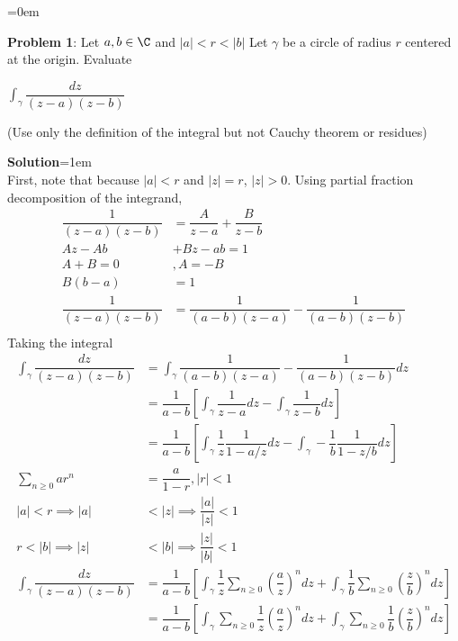 \documentclass{article}
\begin{document}

\newpage\parskip=0em
\begin{mdframed}[backgroundcolor=blue!20]
\textbf{Problem 1}: Let $a, b \in \C$ and $|a| < r < |b|$ Let $\gamma$ be a circle of radius $r$ centered at the origin. Evaluate
\begin{center}
    $\int_{\gamma} \dfrac{dz}{(z-a)(z-b)}$
\end{center}
(Use only the definition of the integral but not Cauchy theorem or residues)
\end{mdframed}
\textbf{Solution}\parskip=1em\\
First, note that because $|a| < r$ and $|z| = r$, $|z| > 0$. Using partial fraction decomposition of the integrand,
\begin{align*}
    \dfrac{1}{(z-a)(z-b)} &= \dfrac{A}{z-a} + \dfrac{B}{z-b}\\
    Az -Ab &+ Bz -ab = 1\\
    A + B = 0 &, A = -B\\
    B(b-a) &= 1\\
    \dfrac{1}{(z-a)(z-b)} &=  \dfrac{1}{(a-b)(z-a)} - \dfrac{1}{(a-b)(z-b)}\\
\end{align*}
Taking the integral 
\begin{align*}
    \int_{\gamma} \dfrac{dz}{(z-a)(z-b)} &= \int_\gamma \dfrac{1}{(a-b)(z-a)} - \dfrac{1}{(a-b)(z-b)}dz\\
    &= \dfrac{1}{a-b}\left[\int_\gamma \dfrac{1}{z-a}dz - \int_\gamma\dfrac{1}{z-b}dz\right]\\
    &= \dfrac{1}{a-b}\left[\int_\gamma \dfrac{1}{z}\dfrac{1}{1-a/z}dz   - \int_\gamma-\dfrac{1}{b}\dfrac{1}{1-z/b}dz\right]\\
    \sum\limits_{n \geq 0}ar^{n} &= \dfrac{a}{1-r}, |r| < 1\\
    |a| < r \implies |a| &< |z| \implies \dfrac{|a|}{|z|} < 1\\
    r < |b| \implies |z| &< |b| \implies \dfrac{|z|}{|b|} < 1\\
    \int_{\gamma} \dfrac{dz}{(z-a)(z-b)} &= \dfrac{1}{a-b}\left[\int_\gamma \dfrac{1}{z}\sum\limits_{n\geq 0}(\dfrac{a}{z})^ndz   + \int_\gamma\dfrac{1}{b}\sum\limits_{n\geq 0}(\dfrac{z}{b})^ndz\right]\\
    &= \dfrac{1}{a-b}\left[\int_\gamma \sum\limits_{n\geq 0}\dfrac{1}{z}(\dfrac{a}{z})^ndz   + \int_\gamma\sum\limits_{n\geq 0} \dfrac{1}{b}(\dfrac{z}{b})^ndz\right]\\
\end{align*}
\end{document}
